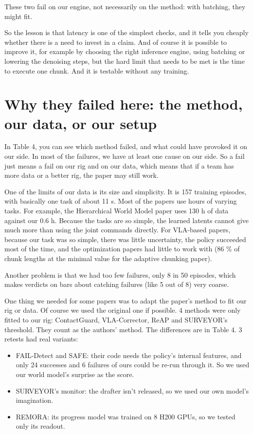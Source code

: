 \documentclass[10pt,twocolumn]{article}
\begin{document}
These two fail on our engine, not necessarily on the method: with batching, they might fit.


So the lesson is that latency is one of the simplest checks, and it tells you cheaply whether there is a need to invest in a claim. And of course it is possible to improve it, for example by choosing the right inference engine, using batching or lowering the denoising steps, but the hard limit that needs to be met is the time to execute one chunk. And it is testable without any training.


\section{Why they failed here: the method, our data, or our setup}


In Table 4, you can see which method failed, and what could have provoked it on our side.
In most of the failures, we have at least one cause on our side. So a fail just means a fail on our rig and on our data, which means that if a team has more data or a better rig, the paper may still work.


One of the limits of our data is its size and simplicity. It is 157 training episodes, with basically one task of about 11 s.
Most of the papers use hours of varying tasks. For example, the Hierarchical World Model paper uses 130 h of data against our 0.6 h.
Because the tasks are so simple, the learned latents cannot give much more than using the joint commands directly.
For VLA-based papers, because our task was so simple, there was little uncertainty, the policy succeeded most of the time, and the optimization papers had little to work with (86 \% of chunk lengths at the minimal value for the adaptive chunking paper).


Another problem is that we had too few failures, only 8 in 50 episodes, which makes verdicts on bars about catching failures (like 5 out of 8) very coarse.


One thing we needed for some papers was to adapt the paper's method to fit our rig or data. Of course we used the original one if possible. 4 methods were only fitted to our rig: ContactGuard, VLA-Corrector, ReAP and SURVEYOR's threshold. They count as the authors' method. The differences are in Table 4.
3 retests had real variants:


\begin{itemize}\setlength{\itemsep}{0pt}\setlength{\parskip}{0pt}\footnotesize
\item FAIL-Detect and SAFE: their code needs the policy's internal features, and only 24 successes and 6 failures of ours could be re-run through it. So we used our world model's surprise as the score.
\item SURVEYOR's monitor: the drafter isn't released, so we used our own model's imagination.
\item REMORA: its progress model was trained on 8 H200 GPUs, so we tested only its readout.
\end{itemize}
\end{document}
